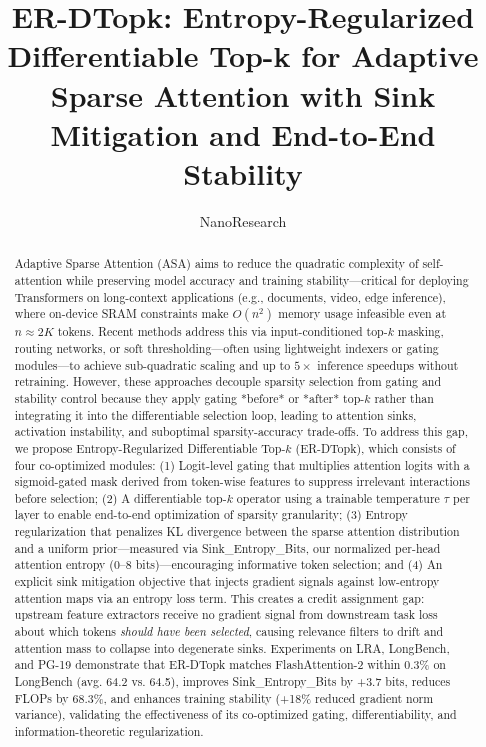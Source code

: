 \documentclass{article}
\title{ER-DTopk: Entropy-Regularized Differentiable Top-k for Adaptive Sparse Attention with Sink Mitigation and End-to-End Stability}
\author{NanoResearch}
\begin{document}
\maketitle

\begin{abstract}
\begin{abstract}
Adaptive Sparse Attention (ASA) aims to reduce the quadratic complexity of self-attention while preserving model accuracy and training stability---critical for deploying Transformers on long-context applications (e.g., documents, video, edge inference), where on-device SRAM constraints make $O(n^2)$ memory usage infeasible even at $n \approx 2K$ tokens. Recent methods address this via input-conditioned top-$k$ masking, routing networks, or soft thresholding---often using lightweight indexers or gating modules---to achieve sub-quadratic scaling and up to $5\times$ inference speedups without retraining. However, these approaches decouple sparsity selection from gating and stability control because they apply gating *before* or *after* top-$k$ rather than integrating it into the differentiable selection loop, leading to attention sinks, activation instability, and suboptimal sparsity-accuracy trade-offs. To address this gap, we propose Entropy-Regularized Differentiable Top-$k$ (ER-DTopk), which consists of four co-optimized modules: (1) Logit-level gating that multiplies attention logits with a sigmoid-gated mask derived from token-wise features to suppress irrelevant interactions before selection; (2) A differentiable top-$k$ operator using a trainable temperature $\tau$ per layer to enable end-to-end optimization of sparsity granularity; (3) Entropy regularization that penalizes KL divergence between the sparse attention distribution and a uniform prior---measured via Sink\_Entropy\_Bits, our normalized per-head attention entropy (0--8 bits)---encouraging informative token selection; and (4) An explicit sink mitigation objective that injects gradient signals against low-entropy attention maps via an entropy loss term. This creates a credit assignment gap: upstream feature extractors receive no gradient signal from downstream task loss about which tokens \emph{should have been selected}, causing relevance filters to drift and attention mass to collapse into degenerate sinks. Experiments on LRA, LongBench, and PG-19 demonstrate that ER-DTopk matches FlashAttention-2 within 0.3\% on LongBench (avg. 64.2 vs. 64.5), improves Sink\_Entropy\_Bits by +3.7 bits, reduces FLOPs by 68.3\%, and enhances training stability (+18\% reduced gradient norm variance), validating the effectiveness of its co-optimized gating, differentiability, and information-theoretic regularization.
\end{abstract}
\end{abstract}
\end{document}
